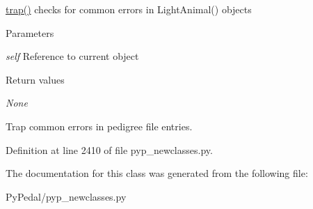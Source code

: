 \hyperlink{classPyPedal_1_1pyp__newclasses_1_1LightAnimal_aaa37d1871c1611ed2eb0a20c89886339}{trap()} checks for common errors in LightAnimal() objects 


\begin{DoxyParams}{Parameters}
\item[{\em self}]Reference to current object \end{DoxyParams}

\begin{DoxyRetVals}{Return values}
\item[{\em None}]\begin{DoxyVerb}
Trap common errors in pedigree file entries.
\end{DoxyVerb}
 \end{DoxyRetVals}


Definition at line 2410 of file pyp\_\-newclasses.py.



The documentation for this class was generated from the following file:\begin{DoxyCompactItemize}
\item 
PyPedal/pyp\_\-newclasses.py\end{DoxyCompactItemize}
